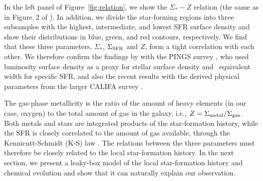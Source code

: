 \documentclass[12pt, appendixfloats, numberedappendix]{emulateapj}
\begin{document}


In the left panel of Figure~\ref{fig:relation}, we show the $\Sigma_{*}-Z$ relation (the same as in Figure~2 of \citealt{barrera16a}). 
In addition, we divide the star-forming regions into three subsamples with the highest, intermediate, and lowest SFR surface density 
and show their distributions in blue, green, and red contours, respectively. 
We find that these three parameters, $\Sigma_{*}$, $\Sigma_{\rm SFR}$ and $Z$,  form a tight correlation with each other.
We therefore confirm the findings by \citet{rosales12a} with the PINGS survey \citep[][]{rosales10a}, 
who used luminosity surface density as a proxy for stellar surface density and \ha\ equivalent width for specific SFR, 
and also the recent results with the derived physical parameters from the larger CALIFA survey \citep[][]{sanchez13a}.


The gas-phase metallicity is the ratio of the amount of heavy elements (in our case, oxygen) to the total amount of gas in the galaxy, 
i.e., $Z=\Sigma_{\rm metal}/\Sigma_{\rm gas}$. 
Both metals and stars are integrated products of the star-formation history, while the SFR is closely correlated to 
the amount of gas available, through the Kennicutt-Schmidt (K-S) law \citep{schmidt59a, kennicutt98a}. 
The relations between the three parameters must therefore be closely related to the local star-formation history. 
In the next section, we present a leaky-box model of the local star-formation history and chemical evolution
and show that it can naturally explain our observation.
\end{document}
